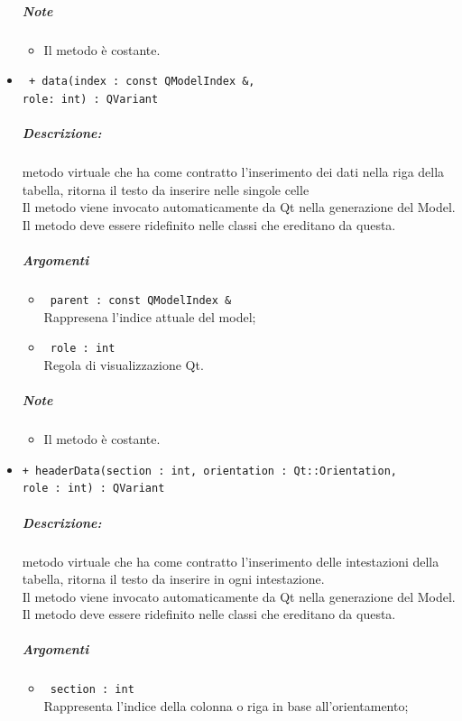 \begin{itemize}
	\subparagraph{Note}
			\begin{itemize}
				\item Il metodo è costante.
			\end{itemize}		
	\item \color{blue}\verb! + data(index : const QModelIndex &, !\\
					\verb!role: int) : QVariant!\\
	\color{black}
	\subparagraph{Descrizione:} metodo virtuale che ha come contratto l'inserimento dei dati nella riga della tabella, ritorna il testo da inserire nelle singole celle\\
		Il metodo viene invocato automaticamente da Qt\g{} nella generazione del Model.\\
		Il metodo deve essere ridefinito nelle classi che ereditano da questa.
	\subparagraph{Argomenti}
		\begin{itemize}
			\item \color{RoyalPurple}\verb! parent : const QModelIndex &!\\
			\color{black}Rappresena l'indice attuale del model;
			
			\item \color{RoyalPurple}\verb! role : int!\\
			\color{black}Regola di visualizzazione Qt\g{}.
		\end{itemize}
	\subparagraph{Note}
			\begin{itemize}
				\item Il metodo è costante.
			\end{itemize}		
	\item \color{blue}\verb!+ headerData(section : int, orientation : Qt::Orientation,!\\
	  \verb!role : int) : QVariant!\\
	\color{black}
	\subparagraph{Descrizione:} metodo virtuale che ha come contratto l'inserimento delle intestazioni della tabella, ritorna il testo da inserire in ogni intestazione.\\
	Il metodo viene invocato automaticamente da Qt\g{} nella generazione del Model.\\
	Il metodo deve essere ridefinito nelle classi che ereditano da questa.
	\subparagraph{Argomenti}
		\begin{itemize}
			\item \color{RoyalPurple}\verb! section : int!\\
			\color{black}Rappresenta l'indice della colonna o riga in base all'orientamento;
			

\end{itemize}
\end{itemize}
